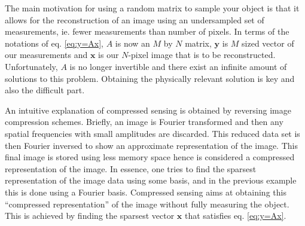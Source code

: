 The main motivation for using a random matrix to sample your object is that it allows for the reconstruction of an image using an undersampled set of measurements, ie. fewer measurements than number of pixels. In terms of the notations of eq. \eqref{eq:y=Ax}, $A$ is now an $M$ by $N$ matrix, $\mathbf{y}$ is $M$ sized vector of our measurements and $\mathbf{x}$ is our $N$-pixel image that is to be reconstructed. Unfortunately, $A$ is no longer invertible and there exist an infinite amount of solutions to this problem. Obtaining the physically relevant solution is key and also the difficult part. 

An intuitive explanation of compressed sensing is obtained by reversing image compression schemes. Briefly, an image is Fourier transformed and then any spatial frequencies with small amplitudes are discarded. This reduced data set is then Fourier inversed to show an approximate representation of the image. This final image is stored using less memory space hence is considered a compressed representation of the image. In essence, one tries to find the sparsest representation of the image data using some basis, and in the previous example this is done using a Fourier basis. Compressed sensing aims at obtaining this ``compressed representation'' of the image without fully measuring the object. This is achieved by finding the sparsest vector $\mathbf{x}$ that satisfies eq. \eqref{eq:y=Ax}.  


